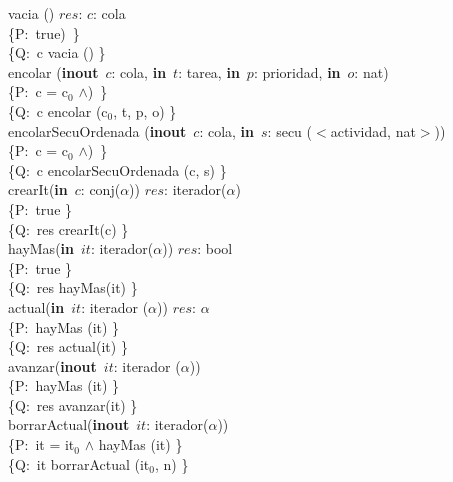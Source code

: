 \documentclass[a4paper,10pt]{article}
\begin{document}
\noindent vacia () \en $res$: $c$: cola \ \ \ \ \ \\
\indent \{P:\ true)\ \}  \\
\indent \{Q:\ c \igobs vacia () \}\\

\noindent encolar (\textbf{inout}\ $c$: cola, \textbf{in}\ $t$: tarea, \textbf{in}\ $p$: prioridad, \textbf{in}\ $o$: nat) \ \ \ \ \ \\
\indent \{P:\ c = c$_0$ $\wedge$)\ \}  \\
\indent \{Q:\ c \igobs encolar (c$_0$, t, p, o) \}\\

\noindent encolarSecuOrdenada (\textbf{inout}\ $c$: cola, \textbf{in}\ $s$: secu ($<$actividad, nat$>$)) \ \ \ \ \ \\
\indent \{P:\ c = c$_0$ $\wedge$)\ \}  \\
\indent \{Q:\ c \igobs encolarSecuOrdenada (c, s) \}\\

\noindent crearIt(\textbf{in}\ $c$: conj($\alpha$))  \en $res$: iterador($\alpha$) \ \ \ \ \ \\
\indent \{P:\ true \}  \\
\indent \{Q:\ res \igobs crearIt(c) \}\\

\noindent hayMas(\textbf{in}\ $it$: iterador($\alpha$))  \en $res$: bool \ \ \ \ \ \\
\indent \{P:\ true \}  \\
\indent \{Q:\ res \igobs hayMas(it) \}\\

\noindent actual(\textbf{in}\ $it$: iterador ($\alpha$))  \en $res$: $\alpha$ \ \ \ \ \ \\
\indent \{P:\ hayMas (it) \}  \\
\indent \{Q:\ res \igobs actual(it) \}\\

\noindent avanzar(\textbf{inout}\ $it$: iterador ($\alpha$)) \ \ \ \ \ \\
\indent \{P:\ hayMas (it) \}  \\
\indent \{Q:\ res \igobs avanzar(it) \}\\

\noindent borrarActual(\textbf{inout}\ $it$: iterador($\alpha$)) \ \ \ \ \ \\
\indent \{P:\ it = it$_0$ $\wedge$ hayMas (it) \}  \\
\indent \{Q:\ it \igobs borrarActual (it$_0$, n) \}\\
\end{document}
